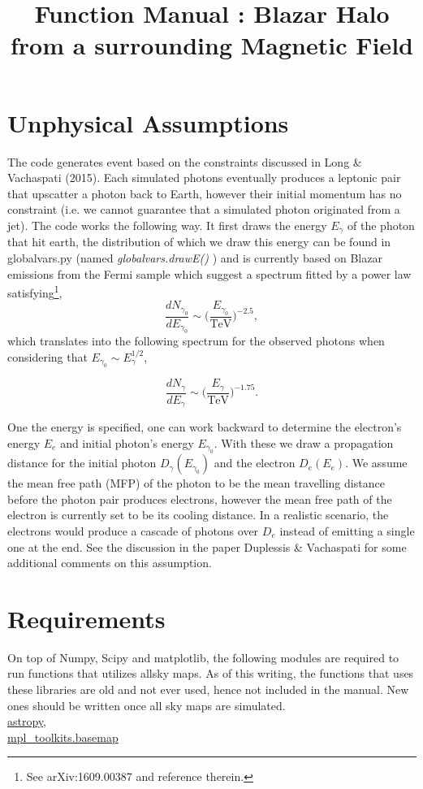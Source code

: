 \documentclass[article, superscriptaddress, ctexart, nofootinbib]{revtex4}
\def\be{\begin{equation}}
\def\ee{\end{equation}}
\begin{document}
\title{Function Manual : Blazar Halo from a surrounding Magnetic Field}
\maketitle
\section{ Unphysical Assumptions}
The code generates event based on the constraints discussed in Long \& Vachaspati (2015).
Each simulated photons eventually produces a leptonic pair that upscatter a photon back to Earth, however their initial momentum has no constraint (i.e. we cannot guarantee that a simulated photon originated from a jet). The code works the following way. 
It first draws the energy $E_\gamma$ of the photon that hit earth, the distribution of which
we draw this energy can be found in globalvars.py (named {\it globalvars.drawE()} )
and is currently based on Blazar emissions from the Fermi sample which suggest a spectrum fitted by a power law satisfying\footnote{See arXiv:1609.00387 and reference therein.},
\be
\frac{dN_{\gamma_0}}{dE_{\gamma_0}}\sim \Big(\frac{E_{\gamma_0}}{\text{TeV}}\Big)^{-2.5},
\ee 
which translates into the following spectrum for the observed photons when considering that $E_{\gamma_0}\sim E_\gamma^{1/2}$,

\be
\frac{dN_{\gamma}}{dE_{\gamma}}\sim \Big(\frac{E_{\gamma}}{\text{TeV}}\Big)^{-1.75}.
\ee 

One the energy is specified, one can work backward to determine the electron's energy $E_e$ and initial photon's energy $E_{\gamma_0}$. With these we
draw a propagation distance for the initial photon $D_\gamma(E_{\gamma_0})$ and the electron $D_e(E_e)$. We assume the mean free path (MFP) of the photon to be
the mean travelling distance before the photon pair produces electrons, however the mean free path of the electron is currently set to be its cooling distance.
In a realistic scenario, the electrons would produce a cascade of photons over $D_e$ instead of emitting a single one at the end. See the discussion in the paper Duplessis \& Vachaspati 
for some additional comments on this assumption.


\section{Requirements}
On top of  Numpy, Scipy and matplotlib, the following modules are required to run functions that utilizes allsky maps. As of this writing, the functions that uses these libraries are 
old and not ever used, hence not included in the manual. New ones should be written once all sky maps are simulated.\\
\href{http://www.astropy.org/}{astropy},\\
\href{http://matplotlib.org/basemap/users/installing.html}{mpl\_toolkits.basemap}
\end{document}
